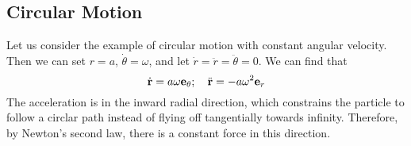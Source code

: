 \subsection{Circular Motion}
Let us consider the example of circular motion with constant angular velocity. Then we can set \(r = a\), \(\dot\theta = \omega\), and let \(\dot r = \ddot r = \ddot \theta = 0\). We can find that
\[ \dot {\vb r} = a \omega \vb e_\theta ;\quad \ddot{\vb r} = -a\omega^2 \vb e_r \]
The acceleration is in the inward radial direction, which constrains the particle to follow a circlar path instead of flying off tangentially towards infinity. Therefore, by Newton's second law, there is a constant force in this direction.
